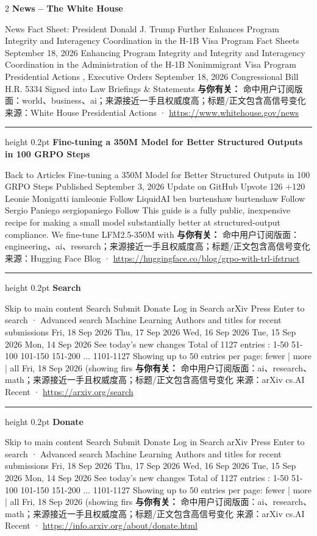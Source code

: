 \documentclass[10.5pt]{ctexart}
\begin{document}
\begin{multicols}{2}
{\large\bfseries News – The White House}\par
News Fact Sheet: President Donald J. Trump Further Enhances Program Integrity and Interagency Coordination in the H-1B Visa Program Fact Sheets September 18, 2026 Enhancing Program Integrity and Integrity and Interagency Coordination in the Administration of the H-1B Nonimmigrant Visa Program Presidential Actions , Executive Orders September 18, 2026 Congressional Bill H.R. 5334 Signed into Law Briefings \& Statements
\textbf{与你有关：} 命中用户订阅版面：world、business、ai；来源接近一手且权威度高；标题/正文包含高信号变化
{\footnotesize\color{ormuted} 来源：White House Presidential Actions · \url{https://www.whitehouse.gov/news}}
\vspace{2mm}
\hrule height 0.2pt
\vspace{2mm}
{\large\bfseries Fine-tuning a 350M Model for Better Structured Outputs in 100 GRPO Steps}\par
Back to Articles Fine-tuning a 350M Model for Better Structured Outputs in 100 GRPO Steps Published September 3, 2026 Update on GitHub Upvote 126 +120 Leonie Monigatti iamleonie Follow LiquidAI ben burtenshaw burtenshaw Follow Sergio Paniego sergiopaniego Follow This guide is a fully public, inexpensive recipe for making a small model substantially better at structured-output compliance. We fine-tune LFM2.5-350M with
\textbf{与你有关：} 命中用户订阅版面：engineering、ai、research；来源接近一手且权威度高；标题/正文包含高信号变化
{\footnotesize\color{ormuted} 来源：Hugging Face Blog · \url{https://huggingface.co/blog/grpo-with-trl-ifstruct}}
\vspace{2mm}
\hrule height 0.2pt
\vspace{2mm}
{\large\bfseries Search}\par
Skip to main content Search Submit Donate Log in Search arXiv Press Enter to search · Advanced search Machine Learning Authors and titles for recent submissions Fri, 18 Sep 2026 Thu, 17 Sep 2026 Wed, 16 Sep 2026 Tue, 15 Sep 2026 Mon, 14 Sep 2026 See today's new changes Total of 1127 entries : 1-50 51-100 101-150 151-200 ... 1101-1127 Showing up to 50 entries per page: fewer | more | all Fri, 18 Sep 2026 (showing firs
\textbf{与你有关：} 命中用户订阅版面：ai、research、math；来源接近一手且权威度高；标题/正文包含高信号变化
{\footnotesize\color{ormuted} 来源：arXiv cs.AI Recent · \url{https://arxiv.org/search}}
\vspace{2mm}
\hrule height 0.2pt
\vspace{2mm}
{\large\bfseries Donate}\par
Skip to main content Search Submit Donate Log in Search arXiv Press Enter to search · Advanced search Machine Learning Authors and titles for recent submissions Fri, 18 Sep 2026 Thu, 17 Sep 2026 Wed, 16 Sep 2026 Tue, 15 Sep 2026 Mon, 14 Sep 2026 See today's new changes Total of 1127 entries : 1-50 51-100 101-150 151-200 ... 1101-1127 Showing up to 50 entries per page: fewer | more | all Fri, 18 Sep 2026 (showing firs
\textbf{与你有关：} 命中用户订阅版面：ai、research、math；来源接近一手且权威度高；标题/正文包含高信号变化
{\footnotesize\color{ormuted} 来源：arXiv cs.AI Recent · \url{https://info.arxiv.org/about/donate.html}}
\end{multicols}
\end{document}
